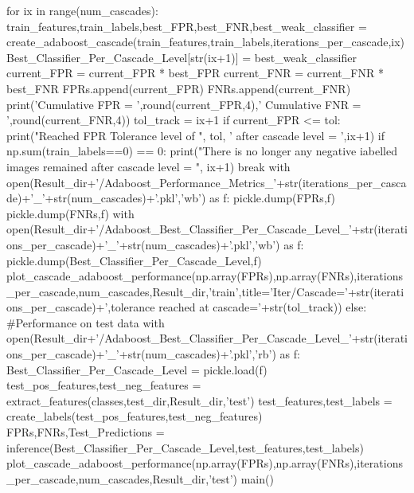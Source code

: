 \documentclass{article}
\begin{document}
\begin{python}
			for ix in range(num_cascades):
				train_features,train_labels,best_FPR,best_FNR,best_weak_classifier = create_adaboost_cascade(train_features,train_labels,iterations_per_cascade,ix)
				Best_Classifier_Per_Cascade_Level[str(ix+1)] = best_weak_classifier
				current_FPR = current_FPR * best_FPR
				current_FNR = current_FNR * best_FNR
				FPRs.append(current_FPR)
				FNRs.append(current_FNR)
				print('Cumulative FPR = ',round(current_FPR,4),' Cumulative FNR = ',round(current_FNR,4))
				tol_track = ix+1
				if current_FPR <= tol:
					print("Reached FPR Tolerance level of ", tol, ' after cascade level = ',ix+1)
				if np.sum(train_labels==0) == 0:
					print("There is no longer any negative iabelled images remained after cascade level = ", ix+1)
					break
			with open(Result_dir+'/Adaboost_Performance_Metrics_'+str(iterations_per_cascade)+'_'+str(num_cascades)+'.pkl','wb') as f:
				pickle.dump(FPRs,f)
				pickle.dump(FNRs,f)
			with open(Result_dir+'/Adaboost_Best_Classifier_Per_Cascade_Level_'+str(iterations_per_cascade)+'_'+str(num_cascades)+'.pkl','wb') as f:
				pickle.dump(Best_Classifier_Per_Cascade_Level,f)
			plot_cascade_adaboost_performance(np.array(FPRs),np.array(FNRs),iterations_per_cascade,num_cascades,Result_dir,'train',title='Iter/Cascade='+str(iterations_per_cascade)+',tolerance reached at cascade='+str(tol_track))
		else:
			#Performance on test data
			with open(Result_dir+'/Adaboost_Best_Classifier_Per_Cascade_Level_'+str(iterations_per_cascade)+'_'+str(num_cascades)+'.pkl','rb') as f:
				Best_Classifier_Per_Cascade_Level = pickle.load(f)
			test_pos_features,test_neg_features = extract_features(classes,test_dir,Result_dir,'test')
			test_features,test_labels = create_labels(test_pos_features,test_neg_features)
			FPRs,FNRs,Test_Predictions = inference(Best_Classifier_Per_Cascade_Level,test_features,test_labels)
			plot_cascade_adaboost_performance(np.array(FPRs),np.array(FNRs),iterations_per_cascade,num_cascades,Result_dir,'test')
main()

\end{python}
\end{document}
